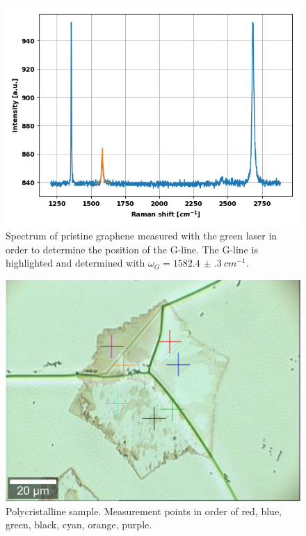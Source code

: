 \documentclass[12pt,a4paper]{article}
\begin{document}
\begin{figure}
\centering
\includegraphics[scale=0.5]{Bilder/part6/prestine_green.png}
\caption{Spectrum of pristine graphene measured with the green laser in order to determine the position of the G-line. The G-line is highlighted and determined with $\omega_{G} = \SI{1582.4(3)}{cm^{-1}}$.}
\label{fig:pristine_green}
\end{figure}

\begin{figure}
\centering
\includegraphics[scale=0.4]{Bilder/part6/4D4RamanFlake.png}
\caption{Polycristalline sample. Measurement points in order of red, blue, green, black, cyan, orange, purple.}
\label{fig:poly_sample}
\end{figure}
\end{document}
